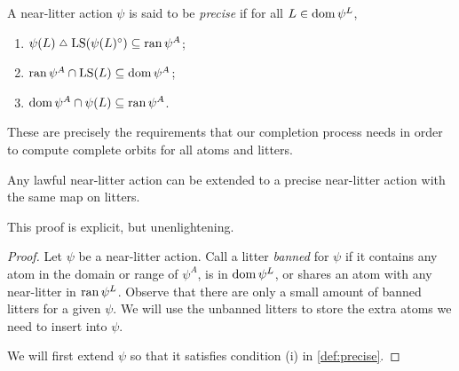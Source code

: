 \begin{definition}
    \label{def:precise}
    A near-litter action \( \psi \) is said to be \emph{precise} if for all \( L \in \operatorname{dom} \psi^L \),
    \begin{enumerate}
        \item \( \psi(L) \symmdiff \LS(\psi(L)^\circ) \subseteq \ran \psi^A \);
        \item \( \operatorname{ran} \psi^A \cap \operatorname{LS}(L) \subseteq \operatorname{dom} \psi^A \);
        \item \( \operatorname{dom} \psi^A \cap \psi(L) \subseteq \operatorname{ran} \psi^A \).
    \end{enumerate}
\end{definition}

These are precisely the requirements that our completion process needs in order to compute complete orbits for all atoms and litters.

\begin{lemma}
    Any lawful near-litter action can be extended to a precise near-litter action with the same map on litters.
\end{lemma}
This proof is explicit, but unenlightening.
\begin{proof}
    Let \( \psi \) be a near-litter action.
    Call a litter \emph{banned} for \( \psi \) if it contains any atom in the domain or range of \( \psi^A \), is in \( \operatorname{dom} \psi^L \), or shares an atom with any near-litter in \( \operatorname{ran} \psi^L \).
    Observe that there are only a small amount of banned litters for a given \( \psi \).
    We will use the unbanned litters to store the extra atoms we need to insert into \( \psi \).

    We will first extend \( \psi \) so that it satisfies condition (i) in \cref{def:precise}.
\end{proof}
